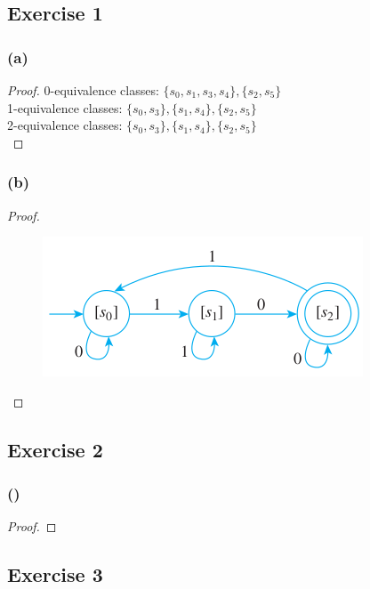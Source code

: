 \documentclass[14pt]{extarticle}
\begin{document}
\subsection{Exercise 1}

\subsubsection{(a)}

\begin{proof}
0-equivalence classes: \(\{s_0, s_1, s_3, s_4\}, \{s_2, s_5\}\) \\
1-equivalence classes: \(\{s_0, s_3\}, \{s_1, s_4\}, \{s_2, s_5\}\) \\
2-equivalence classes: \(\{s_0, s_3\}, \{s_1, s_4\}, \{s_2, s_5\}\) \\
\end{proof}

\subsubsection{(b)}

\begin{proof}
\begin{figure}[ht!]
\centering
\includegraphics[scale=0.5]{../images/12.3.1.b.png}
\end{figure}
\end{proof}

\subsection{Exercise 2}

\subsubsection{()}

\begin{proof}

\end{proof}

\subsection{Exercise 3}
\end{document}
